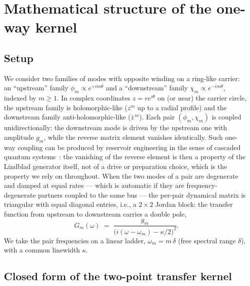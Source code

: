 \documentclass[11pt,a4paper]{article}
\newcommand{\zb}{\bar{z}}
\begin{document}
\section{Mathematical structure of the one-way kernel}
\label{sec:structure}

\subsection{Setup}

We consider two families of modes with opposite winding on a ring-like carrier:
an ``upstream'' family $\phi_m \propto e^{+i m \theta}$ and a ``downstream''
family $\chi_m \propto e^{-i m \theta}$, indexed by $m \geq 1$. In complex
coordinates $z = r e^{i\theta}$ on (or near) the carrier circle, the upstream
family is holomorphic-like ($z^m$ up to a radial profile) and the downstream
family anti-holomorphic-like ($\zb^{\,m}$). Each pair $(\phi_m, \chi_m)$ is coupled
unidirectionally: the downstream mode is driven by the upstream one with
amplitude $g_m$, while the reverse matrix element vanishes identically. Such
one-way coupling can be produced by reservoir engineering in the sense of
cascaded quantum systems~\cite{Gardiner1993,Carmichael1993,MetelmannClerk2015}:
the vanishing of the reverse element is then a
property of the Lindblad generator itself, not of a drive or preparation
choice, which is the property we rely on throughout. When the two modes of a
pair are degenerate and damped at equal rates --- which is automatic if they are
frequency-degenerate partners coupled to the same bus --- the per-pair dynamical
matrix is triangular with equal diagonal entries, i.e., a $2\times 2$ Jordan block: the
transfer function from upstream to downstream carries a double pole,
\begin{equation}
G_m(\omega) \;=\; \frac{g_m}{\bigl(i(\omega - \omega_m) - \kappa/2\bigr)^{2}}.
\end{equation}
We take the pair frequencies on a linear ladder, $\omega_m = m\,\delta$ (free
spectral range $\delta$), with a common linewidth $\kappa$.

\subsection{Closed form of the two-point transfer kernel}
\label{sec:closedform}
\end{document}
